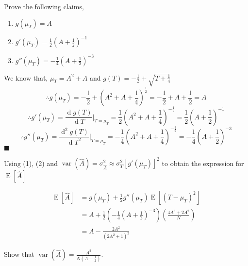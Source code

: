 \documentclass{exam}
\theoremstyle{mytheoremstyle}
\theoremstyle{mytheoremstyle}
\theoremstyle{myproblemstyle}
\begin{document}
\begin{questions}
    \newpage

    \question Prove the following claims,
    \begin{enumerate}
        \item \(g(\mu_{T})=A\)
        \item \(\displaystyle g'(\mu_{T})=\frac{1}{2}\left(A+\frac{1}{2}\right)^{-1}\)
        \item \(\displaystyle g''(\mu_{T})=-\frac{1}{4}\left(A+\frac{1}{2}\right)^{-3}\)
    \end{enumerate}

    \begin{solution}
        We know that, \(\mu_{T}=A^{2}+A\) and \(\displaystyle g(T)=-\frac{1}{2}+\sqrt{T+\frac{1}{4}}\)
        \[\therefore g(\mu_{T})=-\frac{1}{2}+\left(A^{2}+A+\frac{1}{4}\right)^{\frac{1}{2}}=-\frac{1}{2}+A+\frac{1}{2}=A\]
        \[\therefore g'(\mu_{T})=\frac{\operatorname{d}g(T)}{\operatorname{d}T}\bigg|_{T=\mu_{T}}=\frac{1}{2}\left(A^{2}+A+\frac{1}{4}\right)^{-\frac{1}{2}}=\frac{1}{2}\left(A+\frac{1}{2}\right)^{-1}\]
        \[\therefore g''(\mu_{T})=\frac{\operatorname{d}^{2}g(T)}{\operatorname{d}T^{2}}\bigg|_{T=\mu_{T}}=-\frac{1}{4}\left(A^{2}+A+\frac{1}{4}\right)^{-\frac{3}{2}}=-\frac{1}{4}\left(A+\frac{1}{2}\right)^{-3}\]
        \center \(\blacksquare\)
    \end{solution}

    \question Using (1), (2) and \(\displaystyle\operatorname{var}\left(\hat{A}\right)=\sigma^{2}_{\hat{A}}\approx\sigma^{2}_{T}\left[g'\left(\mu_{T}\right)\right]^{2}\) to obtain the expression for \(\operatorname{E}\left[\hat{A}\right]\)

    \begin{solution}
        \begin{align*}
            \operatorname{E}\left[\hat{A}\right] & =g(\mu_{T})+\frac{1}{2}g''(\mu_{T})\operatorname{E}\left[(T-\mu_{T})^{2}\right]                            \\
                                                 & =A+\frac{1}{2}\left(-\frac{1}{4}\left(A+\frac{1}{2}\right)^{-3}\right)\left(\frac{4A^{3}+2A^{2}}{N}\right) \\
                                                 & =A-\frac{2A^{2}}{(2A^{2}+1)^{2}}
        \end{align*}
    \end{solution}

    \newpage

    \question Show that \(\displaystyle\operatorname{var}\left(\hat{A}\right)=\frac{A^2}{N\left(A+\frac{1}{2}\right)}\).


\end{questions}
\end{document}
